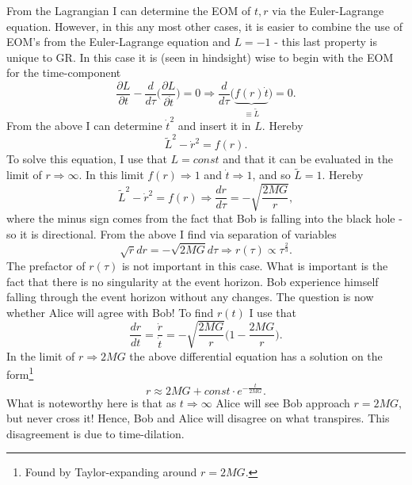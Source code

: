 \begin{example}
	From the Lagrangian I can determine the EOM of $t,r$ via the Euler-Lagrange equation. However, in this any most other cases, it is easier to combine the use of EOM's from the Euler-Lagrange equation and $L=-1$ - this last property is unique to GR. In this case it is (seen in hindsight) wise to begin with the EOM for the time-component
	\begin{equation}
		\frac{\partial L}{\partial t}-\frac{d}{d\tau}\bigg(\frac{\partial L}{\partial \dot{t}}\bigg)=0\Rightarrow \frac{d}{d\tau}\bigg(\underbrace{f(r)\dot{t}}_{\equiv \tilde{L}}\bigg)=0.
	\end{equation} 
	From the above I can determine $\dot{t}^2$ and insert it in $L$. Hereby
	\begin{equation}
		\tilde{L}^2-\dot{r}^2=f(r).
	\end{equation} 
	To solve this equation, I use that $L=const$ and that it can be evaluated in the limit of $r\Rightarrow\infty$. In this limit $f(r)\Rightarrow 1$ and $\dot{t}\Rightarrow1$, and so $\tilde{L}=1$. Hereby
	\begin{equation}
		\tilde{L}^2-\dot{r}^2=f(r)\Rightarrow \frac{dr}{d\tau}=-\sqrt{\frac{2MG}{r}},
	\end{equation} 
	where the minus sign comes from the fact that Bob is falling into the black hole - so it is directional. From the above I find via separation of variables
	\begin{equation}
		\sqrt{r}dr=-\sqrt{2MG}d\tau\Rightarrow r(\tau)\propto \tau^{\frac{2}{3}}.
	\end{equation} 
	The prefactor of $r(\tau)$ is not important in this case. What is important is the fact that there is no singularity at the event horizon. Bob experience himself falling through the event horizon without any changes. The question is now whether Alice will agree with Bob! To find $r(t)$ I use that
	\begin{equation}
		\frac{dr}{dt}=\frac{\dot{r}}{\dot{t}}=-\sqrt{\frac{2MG}{r}}\bigg(1-\frac{2MG}{r}\bigg).
	\end{equation} 
	In the limit of $r\Rightarrow 2MG$ the above differential equation has a solution on the form\footnote{Found by Taylor-expanding around $r=2MG$.}
	\begin{equation}
		r\approx 2MG+const\cdot e^{-\frac{t}{2MG}}.
	\end{equation} 
	What is noteworthy here is that as $t\Rightarrow \infty$ Alice will see Bob approach $r=2MG$, but never cross it! Hence, Bob and Alice will disagree on what transpires. This disagreement is due to time-dilation. 
\end{example}

